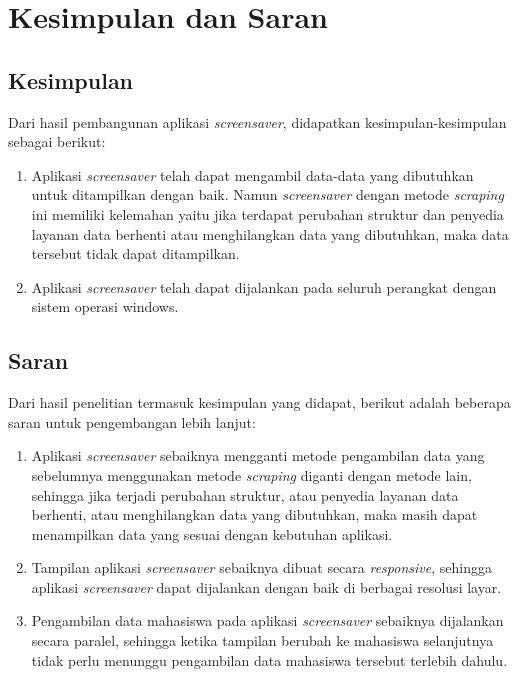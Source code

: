 \chapter{Kesimpulan dan Saran}
\label{chap:kesimpulan_saran}

\section{Kesimpulan}
\label{sec:kesimpulan}
Dari hasil pembangunan aplikasi \textit{screensaver}, didapatkan kesimpulan-kesimpulan sebagai berikut:
\begin{enumerate}
	\item Aplikasi \textit{screensaver} telah dapat mengambil data-data yang dibutuhkan untuk ditampilkan dengan baik. Namun \textit{screensaver} dengan metode \textit{scraping} ini memiliki kelemahan yaitu jika terdapat perubahan struktur dan penyedia layanan data berhenti atau menghilangkan data yang dibutuhkan, maka data tersebut tidak dapat ditampilkan.
	\item Aplikasi \textit{screensaver} telah dapat dijalankan pada seluruh perangkat dengan sistem operasi windows.
	
\end{enumerate}

\section{Saran}
\label{sec:saran}
Dari hasil penelitian termasuk kesimpulan yang didapat, berikut adalah beberapa saran untuk pengembangan lebih lanjut:
\begin{enumerate}
    \item Aplikasi \textit{screensaver} sebaiknya mengganti metode pengambilan data yang sebelumnya menggunakan metode \textit{scraping} diganti dengan metode lain, sehingga jika terjadi perubahan struktur, atau penyedia layanan data berhenti, atau menghilangkan data yang dibutuhkan, maka masih dapat menampilkan data yang sesuai dengan kebutuhan aplikasi.
    \item Tampilan aplikasi \textit{screensaver} sebaiknya dibuat secara \textit{responsive}, sehingga aplikasi \textit{screensaver} dapat dijalankan dengan baik di berbagai resolusi layar.
    \item Pengambilan data mahasiswa pada aplikasi \textit{screensaver} sebaiknya dijalankan secara paralel, sehingga ketika tampilan berubah ke mahasiswa selanjutnya tidak perlu menunggu pengambilan data mahasiswa tersebut terlebih dahulu.
    
\end{enumerate}